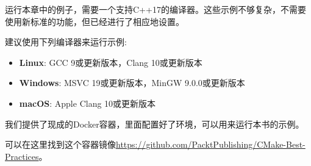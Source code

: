 运行本章中的例子，需要一个支持C++17的编译器。这些示例不够复杂，不需要使用新标准的功能，但已经进行了相应地设置。

建议使用下列编译器来运行示例:

\begin{itemize}
\item \textbf{Linux}: GCC 9或更新版本，Clang 10或更新版本
\item \textbf{Windows}: MSVC 19或更新版本，MinGW 9.0.0或更新版本
\item \textbf{macOS}: Apple Clang 10或更新版本
\end{itemize}

\begin{tcolorbox}[colback=webgreen!5!white,colframe=webgreen!75!black,title=Note]
我们提供了现成的Docker容器，里面配置好了环境，可以用来运行本书的示例。

可以在这里找到这个容器镜像\url{https://github.com/PacktPublishing/CMake-Best-Practices}。
\end{tcolorbox}